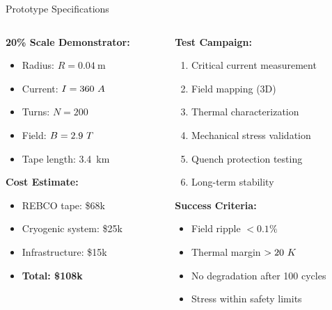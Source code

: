 \begin{frame}{Prototype Specifications}
    \begin{columns}
        \begin{column}{0.5\textwidth}
            \textbf{20\% Scale Demonstrator:}
            \begin{itemize}
                \item Radius: $R = 0.04~\text{m}$
                \item Current: $I = 360~A$
                \item Turns: $N = 200$
                \item Field: $B = 2.9~T$
                \item Tape length: 3.4~km
            \end{itemize}
            
            \vspace{0.3cm}
            \textbf{Cost Estimate:}
            \begin{itemize}
                \item REBCO tape: \$68k
                \item Cryogenic system: \$25k
                \item Infrastructure: \$15k
                \item \textbf{Total: \$108k}
            \end{itemize}
        \end{column}
        \begin{column}{0.5\textwidth}
            \textbf{Test Campaign:}
            \begin{enumerate}
                \item Critical current measurement
                \item Field mapping (3D)
                \item Thermal characterization
                \item Mechanical stress validation
                \item Quench protection testing
                \item Long-term stability
            \end{enumerate}
            
            \vspace{0.3cm}
            \textbf{Success Criteria:}
            \begin{itemize}
                \item Field ripple $< 0.1\%$
                \item Thermal margin $> 20~K$
                \item No degradation after 100 cycles
                \item Stress within safety limits
            \end{itemize}
        \end{column}
    \end{columns}
\end{frame}

